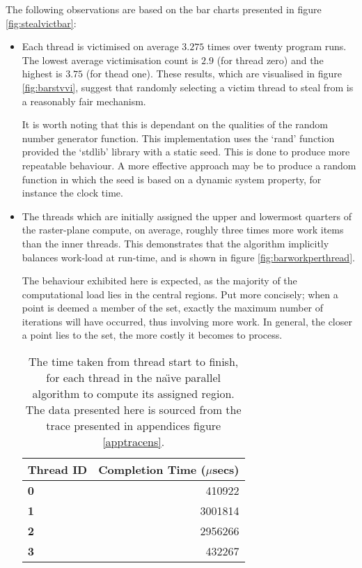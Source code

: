 

The following observations are based on the bar charts presented in figure \ref{fig:stealvictbar}:

\begin{itemize}
\item 
    Each thread is victimised on average \(3.275\) times over twenty program runs. 
    The lowest average victimisation count is \(2.9\) (for thread zero) and the highest is \(3.75\) (for thead one).
    These results, which are visualised in figure \ref{fig:barstvvi}, suggest that randomly selecting a victim 
    thread to steal from is a reasonably fair mechanism.

    It is worth noting that this is dependant on the qualities of the random number generator function.
    This implementation uses the `rand' function provided the `stdlib' library with a static seed. This is done to 
    produce more repeatable behaviour. 
    A more effective approach may be to produce a random function in which the seed is based on a dynamic system property,
    for instance the clock time. 

\item 
    The threads which are initially assigned the upper and lowermost quarters of the raster-plane compute, on average, roughly three times 
    more work items than the inner threads. 
    This demonstrates that the algorithm implicitly balances work-load at run-time, and is shown in figure \ref{fig:barworkperthread}.
    
    The behaviour exhibited here is expected, as the majority of the computational load lies in the central regions. 
    Put more concisely; when a point is deemed a member of the set, exactly the maximum number of iterations will have occurred, thus 
    involving more work. In general, the closer a point lies to the set, the more costly it becomes to process.

\begin{table}[H]
    \centering
    \begin{tabular}{|l|r|}
        \hline
            \textbf{Thread ID} & \textbf{Completion Time} (\(\mu\)secs) \\
        \hline \hline
            \textbf{0} & 410922 \\
            \hline
            \textbf{1} & 3001814 \\
            \textbf{2} & 2956266 \\
            \hline
            \textbf{3} & 432267 \\
            \hline
    \end{tabular}
    \caption{The time taken from thread start to finish, for each thread in the na\"{\i}ve parallel algorithm to compute its assigned region.
The data presented here is sourced from the trace presented in appendices figure \ref{apptracens}.}
    \label{tab:npartab}
\end{table}


\end{itemize}
